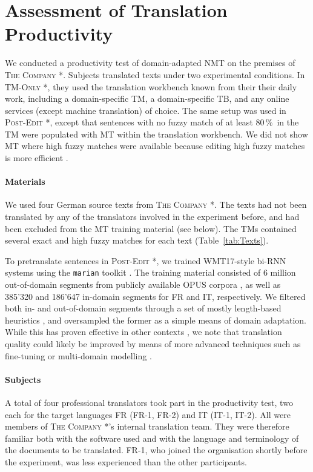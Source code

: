 \documentclass[11pt]{article}
\newcommand{\Table}[1]{Table~\ref{tab:#1}}
\newcommand{\eg}{e.\,g.,\ }
\newcommand{\percent}{\,\%\ }
\newcommand{\tm}{\textsc{TM-Only} }
\newcommand{\pe}{\textsc{Post-Edit} }
\newcommand{\thecompany}{\textsc{The Company} }
\begin{document}
\section{Assessment of Translation Productivity}
\label{sec:Main}

We conducted a productivity test of domain-adapted NMT on the premises of \thecompany*. Subjects translated texts under two experimental conditions. In \tm*, they used the translation workbench known from their their daily work, including a domain-specific TM, a domain-specific TB, and any online services (except machine translation) of choice. The same setup was used in \pe*, except that sentences with no fuzzy match of at least 80\percent in the TM were populated with MT within the translation workbench. We did not show MT where high fuzzy matches were available because editing high fuzzy matches is more efficient \citep{SanchezGijon2019}.

\paragraph{Materials} We used four German source texts from \thecompany*. The texts had not been translated by any of the translators involved in the experiment before, and had been excluded from the MT training material (see below). The TMs contained several exact and high fuzzy matches for each text (\Table{Texts}).

To pretranslate sentences in \pe*, we trained WMT17-style bi-RNN systems \citep{Sennrich2017wmt} using the \texttt{marian} toolkit \citep{Junczys2016}. The training material consisted of 6 million out-of-domain segments from publicly available OPUS corpora \citep{OPUS}, as well as 385'320 and 186'647 in-domain segments for FR and IT, respectively. We filtered both in- and out-of-domain segments through a set of mostly length-based heuristics \citep{zwahlen2016tm}, and oversampled the former as a simple means of domain adaptation. While this has proven effective in other contexts \citep[\eg*][]{Sennrich2016WMT}, we note that translation quality could likely be improved by means of more advanced techniques such as fine-tuning \citep{LuongManning2015} or multi-domain modelling \citep{Chu2017}.

\paragraph{Subjects} A total of four professional translators took part in the productivity test, two each for the target languages FR (FR-1, FR-2) and IT (IT-1, IT-2). All were members of \thecompany*'s internal translation team. They were therefore familiar both with the software used and with the language and terminology of the documents to be translated. FR-1, who joined the organisation shortly before the experiment, was less experienced than the other participants.
\end{document}
